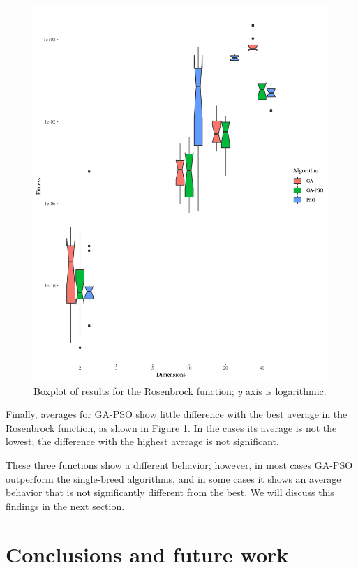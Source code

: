 \documentclass[runningheads]{llncs}
\begin{document}
\begin{figure}[h!tb]
  \centering
  \includegraphics[height=0.4\textheight]{img/rosenbrock-boxplot.png}
  \caption{Boxplot of results for the Rosenbrock function; $y$ axis is logarithmic.\label{fig:boxplot:rosenbrock}}
\end{figure}
%

Finally, averages for GA-PSO show little difference with the best
average in the Rosenbrock function, as shown in Figure
\ref{fig:boxplot:rosenbrock}. In the cases its average is not the
lowest; the difference with the highest average is not significant.

These three functions show a different behavior; however, in most
cases GA-PSO outperform the single-breed algorithms, and in some cases
it shows an average behavior that is not significantly different from
the best. We will discuss this findings in the next section.

\section{Conclusions and future work}
\end{document}
